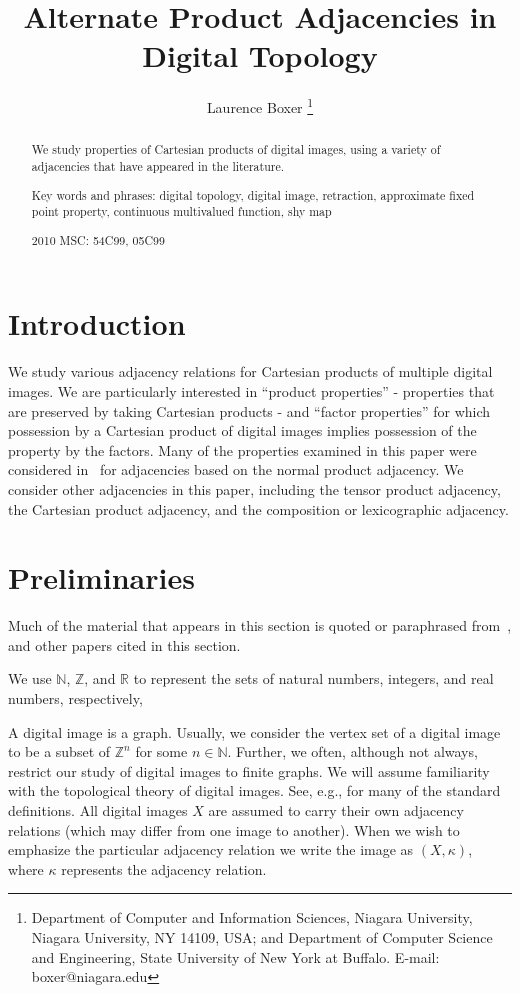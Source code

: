 \documentclass{article}
\theoremstyle{plain}
\theoremstyle{definition}
\numberwithin{thm}{section}
\def\N{{\mathbb N}}
\def\Z{{\mathbb Z}}
\def\R{{\mathbb R}}
\begin{document}
\title{Alternate Product Adjacencies in Digital Topology}
\author{Laurence Boxer
         \thanks{
    Department of Computer and Information Sciences,
    Niagara University,
    Niagara University, NY 14109, USA;
    and Department of Computer Science and Engineering,
    State University of New York at Buffalo.
    E-mail: boxer@niagara.edu
    }
}

\date{ }
\maketitle

\begin{abstract}
We study properties of Cartesian products of digital images, using a variety of
adjacencies that have appeared in the literature.

Key words and phrases: digital topology, digital image, retraction, approximate fixed point property, continuous multivalued function, shy map

2010 MSC: 54C99, 05C99
\end{abstract}

\section{Introduction}
We study various adjacency relations for Cartesian products of
multiple digital images. We are
particularly interested in
``product properties'' - properties that are
preserved by taking Cartesian products - 
and ``factor properties'' for which
possession by a Cartesian product of digital images implies possession of the property by the 
factors. Many of the properties examined in this paper were
considered in~\cite{Boxer16a} for
adjacencies based on the
normal product adjacency. We consider other adjacencies in this
paper, including the tensor product adjacency, the Cartesian product adjacency, and the
composition or lexicographic adjacency.

\section{Preliminaries}
\label{prelims}
Much of the material that appears in this section is quoted or paraphrased
from~\cite{Boxer16a,BoxSta16%
}, and other papers cited in this section.

We use $\N$, $\Z$, and $\R$ to represent
the sets of natural numbers, integers, and 
real numbers, respectively,  

A digital image is a graph. Usually, we consider the vertex set of a digital image to be
a subset of $\Z^n$ for some $n \in \N$. Further, we often, although not always, restrict
our study of digital images to finite graphs.
We will assume familiarity with the topological theory of digital images. See, e.g., \cite{Boxer94} for many of the standard definitions. All digital images $X$ are assumed to carry their own adjacency relations (which may differ from one image to another). When we wish to emphasize the particular adjacency relation we write the image as $(X,\kappa)$, where $\kappa$ represents
the adjacency relation.
\end{document}
